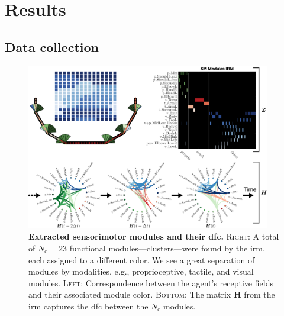 \documentclass[letterpaper, 10 pt, conference]{ieeeconf}  %
\begin{document}
\section{Results}

\subsection{Data collection}
\begin{figure}[t!]
    \centering
    \includegraphics[width=0.95\textwidth]{fig/irm_results_figure_v2.png}
    \vspace{5pt}
    \caption{\textbf{Extracted sensorimotor modules and their \ac{dfc}.} \textsc{Right}: A total of $N_\text{c}=23$ functional modules---clusters---were found by the \ac{irm}, each assigned to a different color. We see a great separation of modules by modalities, e.g., proprioceptive, tactile, and visual modules. \textsc{Left}: Correspondence between the agent's receptive fields and their associated module color. \textsc{Bottom}: The matrix $\bm{H}$ from the \ac{irm} captures the \ac{dfc} between the $N_\text{c}$ modules.}
    \label{fig:irm_modules}
    \vspace{-15pt}
\end{figure}
\end{document}
